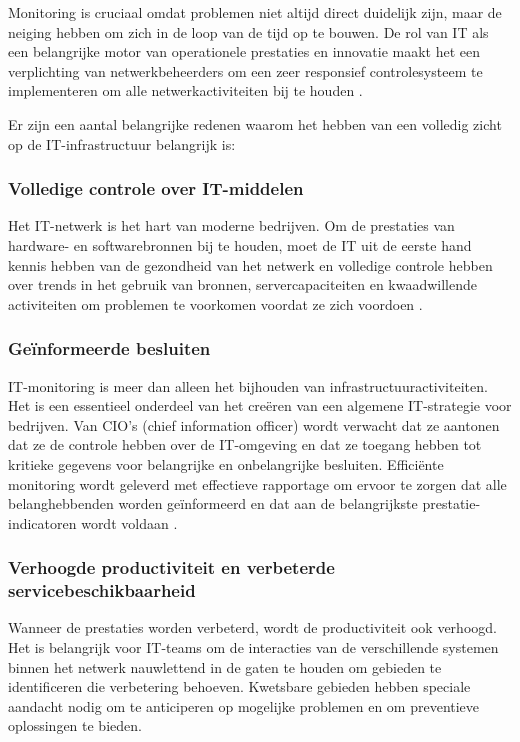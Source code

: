 Monitoring is cruciaal omdat problemen niet altijd direct duidelijk zijn, maar de neiging hebben om zich in de loop van de tijd op te bouwen. De rol van IT als een belangrijke motor van operationele prestaties en innovatie maakt het een verplichting van netwerkbeheerders om een ​​zeer responsief controlesysteem te implementeren om alle netwerkactiviteiten bij te houden \autocite{Matrix2016}.

Er zijn een aantal belangrijke redenen waarom het hebben van een volledig zicht op de IT-infrastructuur belangrijk is: 

\subsubsection{Volledige controle over IT-middelen}

Het IT-netwerk is het hart van moderne bedrijven. Om de prestaties van hardware- en softwarebronnen bij te houden, moet de IT uit de eerste hand kennis hebben van de gezondheid van het netwerk en volledige controle hebben over trends in het gebruik van bronnen, servercapaciteiten en kwaadwillende activiteiten om problemen te voorkomen voordat ze zich voordoen \autocite{Matrix2016}.

\subsubsection{Geïnformeerde besluiten}

IT-monitoring is meer dan alleen het bijhouden van infrastructuuractiviteiten. Het is een essentieel onderdeel van het creëren van een algemene IT-strategie voor bedrijven. Van CIO's (chief information officer) wordt verwacht dat ze aantonen dat ze de controle hebben over de IT-omgeving en dat ze toegang hebben tot kritieke gegevens voor belangrijke en onbelangrijke besluiten. Efficiënte monitoring wordt geleverd met effectieve rapportage om ervoor te zorgen dat alle belanghebbenden worden geïnformeerd en dat aan de belangrijkste prestatie-indicatoren wordt voldaan \autocite{Matrix2016}.

\subsubsection{Verhoogde productiviteit en verbeterde servicebeschikbaarheid}

Wanneer de prestaties worden verbeterd, wordt de productiviteit ook verhoogd. Het is belangrijk voor IT-teams om de interacties van de verschillende systemen binnen het netwerk nauwlettend in de gaten te houden om gebieden te identificeren die verbetering behoeven. Kwetsbare gebieden hebben speciale aandacht nodig om te anticiperen op mogelijke problemen en om preventieve oplossingen te bieden.

